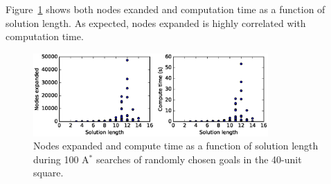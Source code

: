 \documentclass[12pt]{article}
\newenvironment{problem}[2][Problem]{\begin{trivlist}
\item[\hskip \labelsep {\bfseries #1}\hskip \labelsep {\bfseries #2.}]}{\end{trivlist}}
\begin{document}
\begin{problem}{5}
\begin{enumerate}
			\vspace{0.25cm}
			Figure~\ref{fig:p5graph} shows both nodes exanded and computation time as a function of solution length.
			As expected, nodes expanded is highly correlated with computation time.
			\begin{figure}[h]
				\centering
				\includegraphics[width=0.8\textwidth]{fig/p5_h_4_max_20_iter_100_seed_0.eps}
				\caption{Nodes expanded and compute time as a function of solution length during 100 A$^*$ searches of randomly chosen goals in the 40-unit square.}
				\label{fig:p5graph}
			\end{figure}
	\end{enumerate}
\end{problem}
\end{document}
